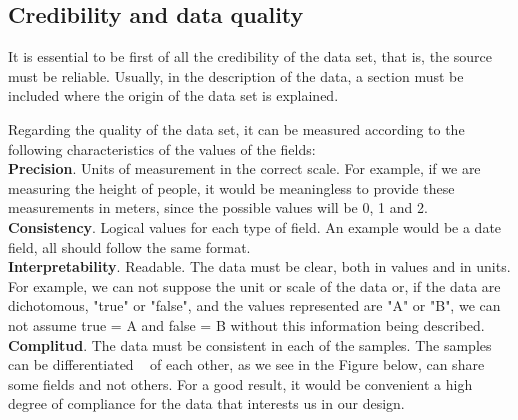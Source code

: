 \subsection{Credibility and data quality}
It is essential to be first of all the credibility of the data set, that is, the source must be reliable. Usually,
in the description of the data, a section must be included where the origin of the data set is explained.

Regarding the quality of the data set, it can be measured according to the following characteristics of the values of the fields: \\
 
\textbf{Precision}. Units of measurement in the correct scale. For example, if we are measuring the height
of people, it would be meaningless to provide these measurements in meters, since the possible values will be 0, 1 and 2. \\

\textbf{Consistency}. Logical values for each type of field. An example would be a date field, all should
follow the same format. \\

\textbf{Interpretability}. Readable. The data must be clear, both in values and in units. For example, we can not
suppose the unit or scale of the data or, if the data are dichotomous, "true" or "false", and the values represented are
"A" or "B", we can not assume true = A and false = B without this information being described. \\

\textbf{Complitud}. The data must be consistent in each of the samples. The samples can be differentiated
  of each other, as we see in the Figure below, can share some fields and not others. For a good result, it would be
convenient a high degree of compliance for the data that interests us in our design.



